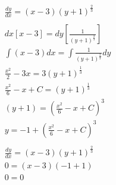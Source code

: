 \documentclass{article}
\begin{document}
    \begin{gather*}\tag{a}
        \frac{dy}{dx} = (x-3)(y+1)^\frac{2}{3}\\\\
        dx[x-3] = dy\left[\frac{1}{(y+1)^\frac{2}{3}}\right]\\
        \int (x-3)dx = \int \frac{1}{(y+1)^\frac{2}{3}}dy\\
        \frac{x^2}{2}-3x=3(y+1)^\frac{1}{3}\\
        \frac{x^2}{6}-x+C = (y+1)^\frac{1}{3} \\
        (y+1) = \left(\frac{x^2}{6}-x+C\right)^3\\
        y = -1+\left(\frac{x^2}{6}-x+C\right)^3\\\\ \tag{b}
        \frac{dy}{dx} = (x-3)(y+1)^\frac{2}{3}\\
        0 = (x-3)(-1+1)\\
        0 = 0 \\
    \end{gather*}
\end{document}
